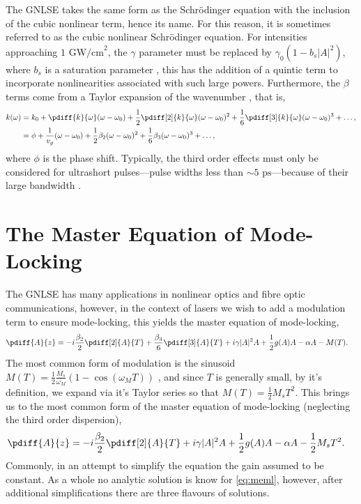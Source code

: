 The GNLSE takes the same form as the Schr\"odinger equation with the inclusion of the cubic nonlinear term, hence its name. For this reason, it is sometimes referred to as the cubic nonlinear Schr\"odinger equation. For intensities approaching $1 \text{ GW/cm}^2$, the $\gamma$ parameter must be replaced by $\gamma_0 (1 - b_s |A|^2)$, where $b_s$ is a saturation parameter \cite{agrawal2013}, this has the addition of a quintic term to incorporate nonlinearities associated with such large powers. Furthermore, the $\beta$ terms come from a Taylor expansion of the wavenumber \cite{kartner}, that is,
\begin{align*}
k(\omega) &= k_0 + \pdiff{k}{\omega}(\omega - \omega_0) + \frac{1}{2} \pdiff[2]{k}{\omega}(\omega - \omega_0)^2 + \frac{1}{6} \pdiff[3]{k}{\omega}(\omega - \omega_0)^3 + \dots, \\
&= \phi + \frac{1}{v_g}(\omega - \omega_0) + \frac{1}{2}\beta_2 (\omega - \omega_0)^2 + \frac{1}{6}\beta_3 (\omega - \omega_0)^3 + \dots,
\end{align*}
where $\phi$ is the phase shift. Typically, the third order effects must only be considered for ultrashort pulses---pulse widths less than $\sim5 \text{ ps}$---because of their large bandwidth \cite{agrawal2013}.

\section{The Master Equation of Mode-Locking}
The GNLSE has many applications in nonlinear optics and fibre optic communications, however, in the context of lasers we wish to add a modulation term to ensure mode-locking, this yields the master equation of mode-locking, \cite{hausbook, haus1975, haus1986, haus1992, haus2000, kartner, tamura, usechak}
\begin{align*}
\pdiff{A}{z} &= - i \frac{\beta_2}{2}\pdiff[2]{A}{T} + \frac{\beta_3}{6}\pdiff[3]{A}{T} + i \gamma |A|^2 A + \frac{1}{2}g(A) A - \alpha A - M(T).
\end{align*}
The most common form of modulation is the sinusoid $M(T) = \frac{1}{2}\frac{M_s}{\omega_M} \left( 1 - \cos \left( \omega_M T \right) \right)$ \cite{hausbook, haus1975, haus1996, kartner}, and since $T$ is generally small, by it's definition, we expand via it's Taylor series so that $M(T) = \frac{1}{2}M_s T^2$. This brings us to the most common form of the master equation of mode-locking (neglecting the third order dispersion),
\begin{align}
\label{eq:meml}
\pdiff{A}{z} &= - i \frac{\beta_2}{2}\pdiff[2]{A}{T} + i \gamma |A|^2 A + \frac{1}{2}g(A) A - \alpha A - \frac{1}{2}M_s T^2.
\end{align}
Commonly, in an attempt to simplify the equation the gain assumed to be constant. As a whole no analytic solution is know for \eqref{eq:meml}, however, after additional simplifications there are three flavours of solutions. \\

